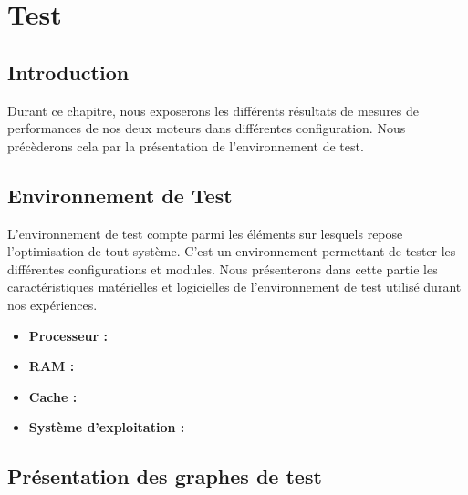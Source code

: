 \chapter{Test}
	\section{Introduction}
Durant ce chapitre, nous exposerons les différents résultats de mesures de performances de nos deux moteurs dans différentes configuration. Nous précèderons cela par la présentation de l'environnement de test.
	
	
	\section{Environnement de Test}
	L'environnement de test compte parmi les éléments sur lesquels repose l'optimisation de tout système. C'est un environnement permettant de tester les différentes configurations et modules. Nous présenterons dans cette partie les caractéristiques matérielles et logicielles de l'environnement de test utilisé durant nos expériences. 
	
	\begin{itemize}[label=$\bullet$]
		\item \textbf{Processeur :}
		\item \textbf{RAM :}
		\item \textbf{Cache :}
		\item \textbf{Système d'exploitation :}
	\end{itemize}
	\section{Présentation des graphes de test}
	
